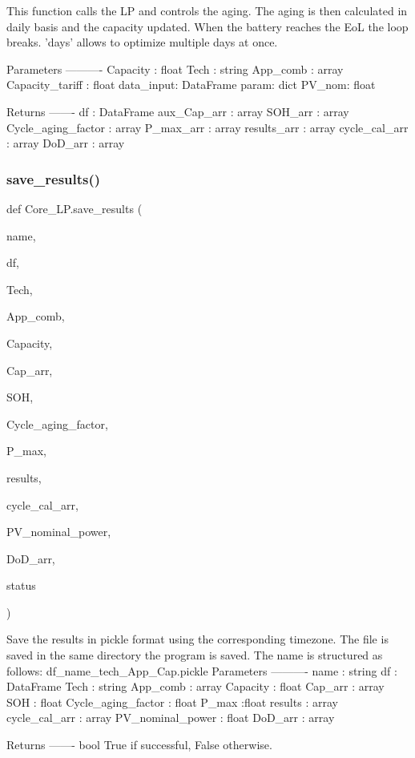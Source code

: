 \begin{DoxyVerb}This function calls the LP and controls the aging. The aging is then
calculated in daily basis and the capacity updated. When the battery
reaches the EoL the loop breaks. 'days' allows to optimize multiple days at once.

Parameters
----------
Capacity : float
Tech : string
App_comb : array
Capacity_tariff : float
data_input: DataFrame
param: dict
PV_nom: float

Returns
-------
df : DataFrame
aux_Cap_arr : array
SOH_arr : array
Cycle_aging_factor : array
P_max_arr : array
results_arr : array
cycle_cal_arr : array
DoD_arr : array
\end{DoxyVerb}
 \mbox{\label{namespace_core___l_p_ad3ce270c3724a0bcc673151adc50ea9b}} 
\subsubsection{\texorpdfstring{save\+\_\+results()}{save\_results()}}
{\footnotesize\ttfamily def Core\+\_\+\+L\+P.\+save\+\_\+results (\begin{DoxyParamCaption}\item[{}]{name,  }\item[{}]{df,  }\item[{}]{Tech,  }\item[{}]{App\+\_\+comb,  }\item[{}]{Capacity,  }\item[{}]{Cap\+\_\+arr,  }\item[{}]{S\+OH,  }\item[{}]{Cycle\+\_\+aging\+\_\+factor,  }\item[{}]{P\+\_\+max,  }\item[{}]{results,  }\item[{}]{cycle\+\_\+cal\+\_\+arr,  }\item[{}]{P\+V\+\_\+nominal\+\_\+power,  }\item[{}]{Do\+D\+\_\+arr,  }\item[{}]{status }\end{DoxyParamCaption})}

\begin{DoxyVerb}Save the results in pickle format using the corresponding timezone.
The file is saved in the same directory the program is saved.
The name is structured as follows: df_name_tech_App_Cap.pickle
Parameters
----------
name : string
df : DataFrame
Tech : string
App_comb : array
Capacity : float
Cap_arr : array
SOH : float
Cycle_aging_factor : float
P_max :float
results : array
cycle_cal_arr : array
PV_nominal_power : float
DoD_arr : array

Returns
-------
bool
    True if successful, False otherwise.\end{DoxyVerb}
 \mbox{\label{namespace_core___l_p_ab1040dbb52cf80c84f076e2cec1c43c5}} 
